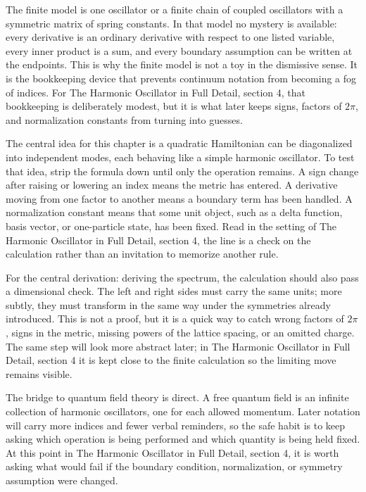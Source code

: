 The finite model is one oscillator or a finite chain of coupled oscillators with a symmetric matrix of spring constants.  In that model no mystery is available: every derivative is an ordinary derivative with respect to one listed variable, every inner product is a sum, and every boundary assumption can be written at the endpoints.  This is why the finite model is not a toy in the dismissive sense.  It is the bookkeeping device that prevents continuum notation from becoming a fog of indices.  For The Harmonic Oscillator in Full Detail, section 4, that bookkeeping is deliberately modest, but it is what later keeps signs, factors of \(2\pi\), and normalization constants from turning into guesses.

The central idea for this chapter is a quadratic Hamiltonian can be diagonalized into independent modes, each behaving like a simple harmonic oscillator.  To test that idea, strip the formula down until only the operation remains.  A sign change after raising or lowering an index means the metric has entered.  A derivative moving from one factor to another means a boundary term has been handled.  A normalization constant means that some unit object, such as a delta function, basis vector, or one-particle state, has been fixed.  Read in the setting of The Harmonic Oscillator in Full Detail, section 4, the line is a check on the calculation rather than an invitation to memorize another rule.

For the central derivation: deriving the spectrum, the calculation should also pass a dimensional check.  The left and right sides must carry the same units; more subtly, they must transform in the same way under the symmetries already introduced.  This is not a proof, but it is a quick way to catch wrong factors of \(2\pi\), signs in the metric, missing powers of the lattice spacing, or an omitted charge.  The same step will look more abstract later; in The Harmonic Oscillator in Full Detail, section 4 it is kept close to the finite calculation so the limiting move remains visible.

The bridge to quantum field theory is direct.  A free quantum field is an infinite collection of harmonic oscillators, one for each allowed momentum.  Later notation will carry more indices and fewer verbal reminders, so the safe habit is to keep asking which operation is being performed and which quantity is being held fixed.  At this point in The Harmonic Oscillator in Full Detail, section 4, it is worth asking what would fail if the boundary condition, normalization, or symmetry assumption were changed.

